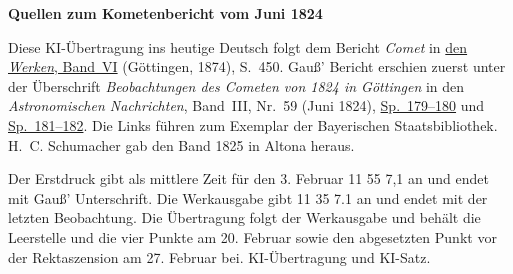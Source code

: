 \clearpage\thispagestyle{empty}
\begin{center}\textbf{Quellen zum Kometenbericht vom Juni 1824}\end{center}
\noindent Diese KI-Übertragung ins heutige Deutsch folgt dem Bericht \textit{Comet} in \href{https://gdz.sub.uni-goettingen.de/id/PPN236007467}{den \textit{Werken}, Band~VI} (Göttingen, 1874), S.~450. Gauß’ Bericht erschien zuerst unter der Überschrift \textit{Beobachtungen des Cometen von 1824 in Göttingen} in den \textit{Astronomischen Nachrichten}, Band~III, Nr.~59 (Juni 1824), \href{https://api.digitale-sammlungen.de/iiif/image/v2/bsb10049428_00102/full/1800,/0/default.jpg}{Sp.~179--180} und \href{https://api.digitale-sammlungen.de/iiif/image/v2/bsb10049428_00103/full/1800,/0/default.jpg}{Sp.~181--182}. Die Links führen zum Exemplar der Bayerischen Staatsbibliothek. H.~C. Schumacher gab den Band 1825 in Altona heraus.
\par\smallskip\noindent Der Erstdruck gibt als mittlere Zeit für den 3. Februar 11 55 7,1 an und endet mit Gauß’ Unterschrift. Die Werkausgabe gibt 11 35 7.1 an und endet mit der letzten Beobachtung. Die Übertragung folgt der Werkausgabe und behält die Leerstelle und die vier Punkte am 20. Februar sowie den abgesetzten Punkt vor der Rektaszension am 27. Februar bei. KI-Übertragung und KI-Satz.
\clearpage
